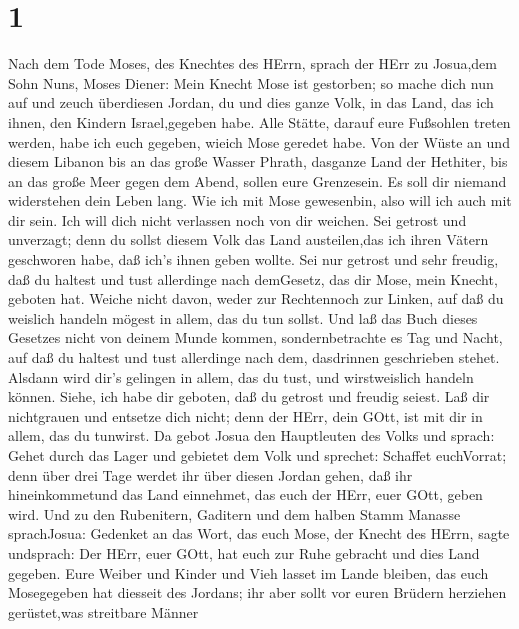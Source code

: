 \hypertarget{section}{%
\section{1}\label{section}}

 Nach dem Tode Moses, des Knechtes des HErrn, sprach der
HErr zu Josua,dem Sohn Nuns, Moses Diener:  Mein Knecht Mose
ist gestorben; so mache dich nun auf und zeuch überdiesen Jordan, du und
dies ganze Volk, in das Land, das ich ihnen, den Kindern Israel,gegeben
habe.  Alle Stätte, darauf eure Fußsohlen treten werden,
habe ich euch gegeben, wieich Mose geredet habe.  Von der
Wüste an und diesem Libanon bis an das große Wasser Phrath, dasganze
Land der Hethiter, bis an das große Meer gegen dem Abend, sollen eure
Grenzesein.  Es soll dir niemand widerstehen dein Leben
lang. Wie ich mit Mose gewesenbin, also will ich auch mit dir sein. Ich
will dich nicht verlassen noch von dir weichen.  Sei getrost
und unverzagt; denn du sollst diesem Volk das Land austeilen,das ich
ihren Vätern geschworen habe, daß ich's ihnen geben wollte. 
Sei nur getrost und sehr freudig, daß du haltest und tust allerdinge
nach demGesetz, das dir Mose, mein Knecht, geboten hat. Weiche nicht
davon, weder zur Rechtennoch zur Linken, auf daß du weislich handeln
mögest in allem, das du tun sollst.  Und laß das Buch dieses
Gesetzes nicht von deinem Munde kommen, sondernbetrachte es Tag und
Nacht, auf daß du haltest und tust allerdinge nach dem, dasdrinnen
geschrieben stehet. Alsdann wird dir's gelingen in allem, das du tust,
und wirstweislich handeln können.  Siehe, ich habe dir
geboten, daß du getrost und freudig seiest. Laß dir nichtgrauen und
entsetze dich nicht; denn der HErr, dein GOtt, ist mit dir in allem, das
du tunwirst.  Da gebot Josua den Hauptleuten des Volks und
sprach:  Gehet durch das Lager und gebietet dem Volk und
sprechet: Schaffet euchVorrat; denn über drei Tage werdet ihr über
diesen Jordan gehen, daß ihr hineinkommetund das Land einnehmet, das
euch der HErr, euer GOtt, geben wird.  Und zu den
Rubenitern, Gaditern und dem halben Stamm Manasse sprachJosua:
 Gedenket an das Wort, das euch Mose, der Knecht des HErrn,
sagte undsprach: Der HErr, euer GOtt, hat euch zur Ruhe gebracht und
dies Land gegeben.  Eure Weiber und Kinder und Vieh lasset
im Lande bleiben, das euch Mosegegeben hat diesseit des Jordans; ihr
aber sollt vor euren Brüdern herziehen gerüstet,was streitbare Männer
